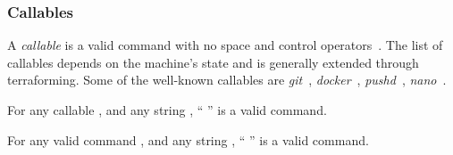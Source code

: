 \subsubsection{Callables}
\label{callables}

A \emph{callable} is a valid command with no space and control operators~. The list of callables depends on the machine's state and is generally extended through terraforming. Some of the well-known callables are \emph{git}~, \emph{docker}~, \emph{pushd}~, \emph{nano}~. 

\begin{theorem}
For any callable , and any string , `` '' is a valid command.
\end{theorem}

\begin{theorem}
For any valid command , and any string , `` '' is a valid command.
\end{theorem}